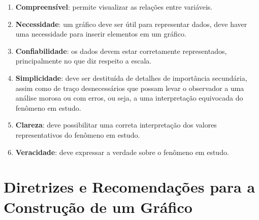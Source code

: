 \begin{enumerate}

\item \textbf{Compreensível}: permite visualizar as relações entre variáveis.
\item \textbf{Necessidade}: um gráfico deve ser útil para representar dados, deve haver uma necessidade para inserir elementos em um gráfico.
\item \textbf{Confiabilidade}: os dados devem estar corretamente representados, principalmente no que diz respeito a escala.
\item \textbf{Simplicidade}: deve ser destituída de detalhes de importância secundária, assim como de traço desnecessários que possam levar o observador a uma análise morosa ou com erros, ou seja, a uma interpretação equivocada do fenômeno em estudo. 
\item \textbf{Clareza}: deve possibilitar uma correta interpretação dos valores representativos do fenômeno em estudo. 
\item \textbf{Veracidade}: deve expressar a verdade sobre o fenômeno em estudo.
\end{enumerate}

\section{Diretrizes e Recomendações para a Construção de um Gráfico}

